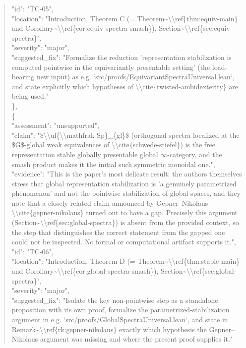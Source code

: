 \documentclass[11pt]{article}
\begin{document}
\begin{quote}
      "id": "TC-05",\\
      "location": "Introduction, Theorem C (= Theorem\~{}\textbackslash{}\textbackslash{}ref\{thm:equiv-main\} and Corollary\~{}\textbackslash{}\textbackslash{}ref\{cor:equiv-spectra-smash\}), Section\~{}\textbackslash{}\textbackslash{}ref\{sec:equiv-spectra\}",\\
      "severity": "major",\\
      "suggested\_fix": "Formalize the reduction 'representation stabilization is computed pointwise in the equivariantly presentable setting' (the load-bearing new input) as e.g. `src/proofs/EquivariantSpectraUniversal.lean`, and state explicitly which hypotheses of \textbackslash{}\textbackslash{}cite\{twisted-ambidexterity\} are being used."\\
    \},\\
    \{\\
      "assessment": "unsupported",\\
      "claim": "\$\textbackslash{}\textbackslash{}ul\{\textbackslash{}\textbackslash{}mathfrak Sp\}\_\{gl\}\$ (orthogonal spectra localized at the \$G\$-global weak equivalences of \textbackslash{}\textbackslash{}cite\{schwede-stiefel\}) is the free representation stable globally presentable global \ensuremath{\infty}-category, and the smash product makes it the initial such symmetric monoidal one.",\\
      "evidence": "This is the paper's most delicate result: the authors themselves stress that global representation stabilization is 'a genuinely parametrized phenomenon' and not the pointwise stabilization of global spaces, and they note that a closely related claim announced by Gepner--Nikolaus \textbackslash{}\textbackslash{}cite\{gepner-nikolaus\} turned out to have a gap. Precisely this argument (Section\~{}\textbackslash{}\textbackslash{}ref\{sec:global-spectra\}) is absent from the provided context, so the step that distinguishes the correct statement from the gapped one could not be inspected. No formal or computational artifact supports it.",\\
      "id": "TC-06",\\
      "location": "Introduction, Theorem D (= Theorem\~{}\textbackslash{}\textbackslash{}ref\{thm:stable-main\} and Corollary\~{}\textbackslash{}\textbackslash{}ref\{cor:global-spectra-smash\}), Section\~{}\textbackslash{}\textbackslash{}ref\{sec:global-spectra\}",\\
      "severity": "major",\\
      "suggested\_fix": "Isolate the key non-pointwise step as a standalone proposition with its own proof, formalize the parametrized-stabilization argument in e.g. `src/proofs/GlobalSpectraUniversal.lean`, and state in Remark\~{}\textbackslash{}\textbackslash{}ref\{rk:gepner-nikolaus\} exactly which hypothesis the Gepner--Nikolaus argument was missing and where the present proof supplies it."\\

\end{quote}
\end{document}
